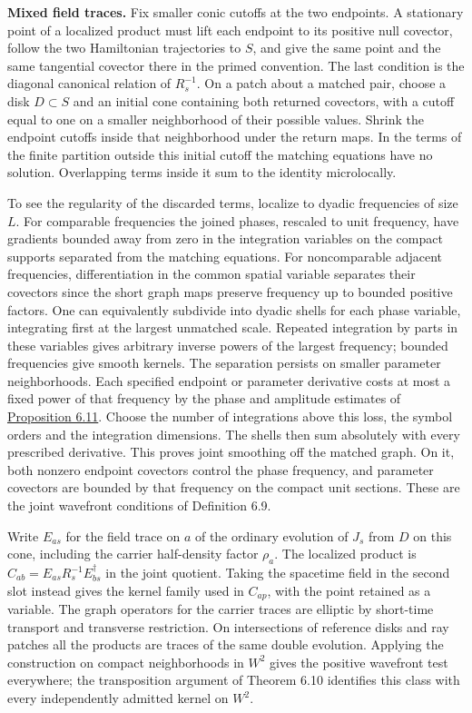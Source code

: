 \documentclass[
  english,
  11pt,
  reqno]{amsart}
\makeatletter
\newcommand{\paperleadspace}{%
  \par\if@nobreak\else
    \addpenalty{\@secpenalty}\addvspace{.5\baselineskip}%
  \fi}
\newcommand{\paperleadin}[1]{%
  \ifvmode\paperleadspace\fi
  \textbf{#1}}
\makeatother
\begin{document}
\paperleadin{Mixed field traces.} Fix smaller conic cutoffs at the two
endpoints. A stationary point of a localized product must lift each
endpoint to its positive null covector, follow the two Hamiltonian
trajectories to \(S\), and give the same point and the same tangential
covector there in the primed convention. The last condition is the
diagonal canonical relation of \(R_s^{-1}\). On a patch about a matched
pair, choose a disk \(D\subset S\) and an initial cone containing both
returned covectors, with a cutoff equal to one on a smaller neighborhood
of their possible values. Shrink the endpoint cutoffs inside that
neighborhood under the return maps. In the terms of the finite partition
outside this initial cutoff the matching equations have no solution.
Overlapping terms inside it sum to the identity microlocally.

To see the regularity of the discarded terms, localize to dyadic
frequencies of size \(L\). For comparable frequencies the joined phases,
rescaled to unit frequency, have gradients bounded away from zero in the
integration variables on the compact supports separated from the
matching equations. For noncomparable adjacent frequencies,
differentiation in the common spatial variable separates their covectors
since the short graph maps preserve frequency up to bounded positive
factors. One can equivalently subdivide into dyadic shells for each
phase variable, integrating first at the largest unmatched scale.
Repeated integration by parts in these variables gives arbitrary inverse
powers of the largest frequency; bounded frequencies give smooth
kernels. The separation persists on smaller parameter neighborhoods.
Each specified endpoint or parameter derivative costs at most a fixed
power of that frequency by the phase and amplitude estimates of
\hyperref[prop:online-wave-kernel-finite-families]{Proposition 6.11}.
Choose the number of integrations above this loss, the symbol orders and
the integration dimensions. The shells then sum absolutely with every
prescribed derivative. This proves joint smoothing off the matched
graph. On it, both nonzero endpoint covectors control the phase
frequency, and parameter covectors are bounded by that frequency on the
compact unit sections. These are the joint wavefront conditions of
Definition 6.9.

Write \(E_{as}\) for the field trace on \(a\) of the ordinary evolution
of \(J_s\) from \(D\) on this cone, including the carrier half-density
factor \(\rho_a\). The localized product is
\(C_{ab}=E_{as}R_s^{-1}E_{bs}^\dagger\) in the joint quotient. Taking
the spacetime field in the second slot instead gives the kernel family
used in \(C_{ap}\), with the point retained as a variable. The graph
operators for the carrier traces are elliptic by short-time transport
and transverse restriction. On intersections of reference disks and ray
patches all the products are traces of the same double evolution.
Applying the construction on compact neighborhoods in \(W^2\) gives the
positive wavefront test everywhere; the transposition argument of
Theorem 6.10 identifies this class with every independently admitted
kernel on \(W^2\).
\end{document}
